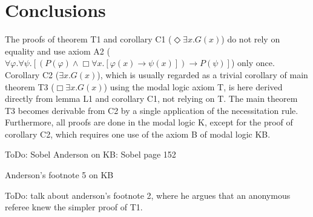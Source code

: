 \documentclass{llncs}
\newcommand{\imp}{\rightarrow}
\newcommand{\all}{\forall}
\newcommand{\ex}{\exists}
\newcommand{\nec}{\Box} %
\newcommand{\pos}{\Diamond} %
\begin{document}





\section{Conclusions}

The proofs of theorem T1 and corollary C1 ($\pos \ex x. G(x)$) do not rely on equality and use axiom A2 ($\all \varphi. \all \psi.[(P(\varphi) \wedge \nec \all x.[\varphi(x) \imp \psi(x)]) \imp P(\psi)]$) only once. 
Corollary C2 ($\ex x. G(x)$), which is usually regarded as a trivial corollary of main theorem T3 ($\nec \ex x. G(x)$) using the modal logic axiom T, is here derived directly from lemma L1 and corollary C1, not relying on T. The main theorem T3 becomes derivable from C2 by a single application of the necessitation rule. Furthermore, all proofs are done in the modal logic K, except for the proof of corollary C2, which requires one use of the axiom B of modal logic KB.

ToDo: Sobel Anderson on KB: Sobel page 152

Anderson's footnote 5 on KB

ToDo: talk about anderson's footnote 2, where he argues that an anonymous referee knew the simpler proof of T1.
\end{document}
